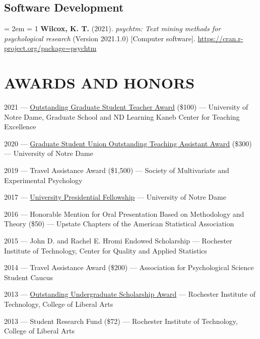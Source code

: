 \documentclass[
  12 pt,
]{article}
\begin{document}
\hypertarget{software-development}{%
\subsection{Software Development}\label{software-development}}

\hangindent = 2em \hangafter = 1 \textbf{Wilcox, K. T.} (2021).
\emph{psychtm: Text mining methods for psychological research} (Version
2021.1.0) {[}Computer software{]}.
\url{https://cran.r-project.org/package=psychtm}

\hypertarget{awards-and-honors}{%
\section{AWARDS AND HONORS}\label{awards-and-honors}}

2021 ---
\href{https://learning.nd.edu/for-grad-student-post-docs-2/outstanding-graduate-student-ta-awards/}{Outstanding
Graduate Student Teacher Award} (\$100) --- University of Notre Dame,
Graduate School and ND Learning \textbar{} Kaneb Center for Teaching
Excellence

2020 ---
\href{https://gsg.nd.edu/funding-awards/teaching-assistant-award/}{Graduate
Student Union Outstanding Teaching Assistant Award} (\$300) ---
University of Notre Dame

2019 --- Travel Assistance Award (\$1,500) --- Society of Multivariate
and Experimental Psychology

2017 ---
\href{https://graduateschool.nd.edu/funding/select-fellowships/university-presidential-fellowship-in-humanities-and-social-sciences/}{University
Presidential Fellowship} --- University of Notre Dame

2016 --- Honorable Mention for Oral Presentation Based on Methodology
and Theory (\$50) --- Upstate Chapters of the American Statistical
Association

2015 --- John D. and Rachel E. Hromi Endowed Scholarship --- Rochester
Institute of Technology, Center for Quality and Applied Statistics

2014 --- Travel Assistance Award (\$200) --- Association for
Psychological Science Student Caucus

2013 ---
\href{https://www.rit.edu/provost/outstanding-undergraduate-scholar-award}{Outstanding
Undergraduate Scholarship Award} --- Rochester Institute of Technology,
College of Liberal Arts

2013 --- Student Research Fund (\$72) --- Rochester Institute of
Technology, College of Liberal Arts
\end{document}
